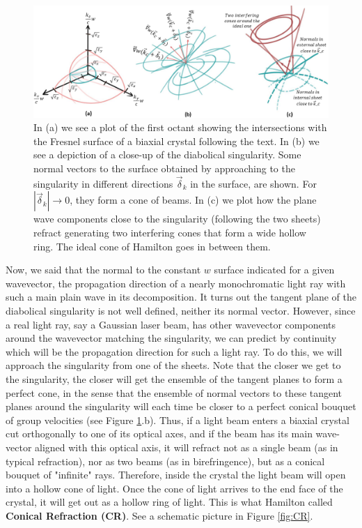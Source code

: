\documentclass[11pt, a4paper, twoside]{article} %
\begin{document}
\begin{figure}[h!] 
\center
    \includegraphics[width=0.95\linewidth]{bi.PNG}
    \caption{In (a) we see a plot of the first octant showing the intersections with the Fresnel surface of a biaxial crystal following the text. In (b) we see a depiction of a close-up of the diabolical singularity. Some normal vectors to the surface obtained by approaching to the singularity in different directions $\vec{\delta}_k$ in the surface, are shown. For $|\vec{\delta}_k|\rightarrow 0$, they form a cone of beams. In (c) we plot how the plane wave components close to the singularity (following the two sheets) refract generating two interfering cones that form a wide hollow ring. The ideal cone of Hamilton goes in between them.}
    \label{fig:concentric2}\vspace{-0.1cm}
\end{figure}

Now, we said that the normal to the constant $w$ surface indicated for a given wavevector, the propagation direction of a nearly monochromatic light ray with such a main plain wave in its decomposition. It turns out the tangent plane of the diabolical singularity is not well defined, neither its normal vector. However, since a real light ray, say a Gaussian laser beam, has other wavevector components around the wavevector matching the singularity, we can predict by continuity which will be the propagation direction for such a light ray. To do this, we will approach the singularity from one of the sheets. Note that the closer we get to the singularity, the closer will get the ensemble of the tangent planes to form a perfect cone, in the sense that the ensemble of normal vectors to these tangent planes around the singularity will each time be closer to a perfect conical bouquet of group velocities (see Figure \ref{fig:concentric2}.b). Thus, if a light beam enters a biaxial crystal cut orthogonally to one of its optical axes, and if the beam has its main wave-vector aligned with this optical axis, it will refract not as a single beam (as in typical refraction), nor as two beams (as in birefringence), but as a conical bouquet of "infinite" rays. Therefore, inside the crystal the light beam will open into a hollow cone of light. Once the cone of light arrives to the end face of the crystal, it will get out as a hollow ring of light. This is what Hamilton called {\bf Conical Refraction (CR)}. See a schematic picture in Figure \ref{fig:CR}.\vspace{0.2cm}
\end{document}
